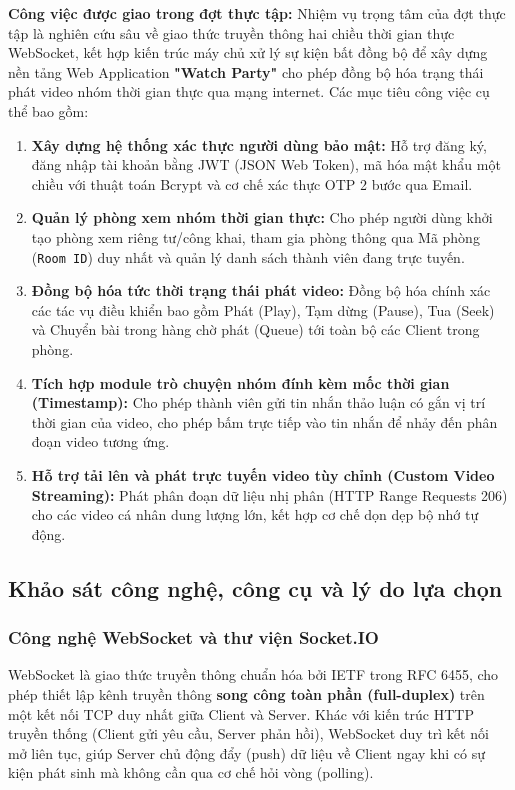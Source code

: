 \documentclass[12pt,a4paper]{extarticle}
\begin{document}
\textbf{Công việc được giao trong đợt thực tập:}
Nhiệm vụ trọng tâm của đợt thực tập là nghiên cứu sâu về giao thức truyền thông hai chiều thời gian thực WebSocket, kết hợp kiến trúc máy chủ xử lý sự kiện bất đồng bộ để xây dựng nền tảng Web Application \textbf{"Watch Party"} cho phép đồng bộ hóa trạng thái phát video nhóm thời gian thực qua mạng internet. Các mục tiêu công việc cụ thể bao gồm:
\begin{enumerate}[leftmargin=1.2cm]
    \item \textbf{Xây dựng hệ thống xác thực người dùng bảo mật:} Hỗ trợ đăng ký, đăng nhập tài khoản bằng JWT (JSON Web Token), mã hóa mật khẩu một chiều với thuật toán Bcrypt và cơ chế xác thực OTP 2 bước qua Email.
    \item \textbf{Quản lý phòng xem nhóm thời gian thực:} Cho phép người dùng khởi tạo phòng xem riêng tư/công khai, tham gia phòng thông qua Mã phòng (\texttt{Room ID}) duy nhất và quản lý danh sách thành viên đang trực tuyến.
    \item \textbf{Đồng bộ hóa tức thời trạng thái phát video:} Đồng bộ hóa chính xác các tác vụ điều khiển bao gồm Phát (Play), Tạm dừng (Pause), Tua (Seek) và Chuyển bài trong hàng chờ phát (Queue) tới toàn bộ các Client trong phòng.
    \item \textbf{Tích hợp module trò chuyện nhóm đính kèm mốc thời gian (Timestamp):} Cho phép thành viên gửi tin nhắn thảo luận có gắn vị trí thời gian của video, cho phép bấm trực tiếp vào tin nhắn để nhảy đến phân đoạn video tương ứng.
    \item \textbf{Hỗ trợ tải lên và phát trực tuyến video tùy chỉnh (Custom Video Streaming):} Phát phân đoạn dữ liệu nhị phân (HTTP Range Requests 206) cho các video cá nhân dung lượng lớn, kết hợp cơ chế dọn dẹp bộ nhớ tự động.
\end{enumerate}


\subsection{Khảo sát công nghệ, công cụ và lý do lựa chọn}

\subsubsection{Công nghệ WebSocket và thư viện Socket.IO}
WebSocket là giao thức truyền thông chuẩn hóa bởi IETF trong RFC 6455, cho phép thiết lập kênh truyền thông \textbf{song công toàn phần (full-duplex)} trên một kết nối TCP duy nhất giữa Client và Server. Khác với kiến trúc HTTP truyền thống (Client gửi yêu cầu, Server phản hồi), WebSocket duy trì kết nối mở liên tục, giúp Server chủ động đẩy (push) dữ liệu về Client ngay khi có sự kiện phát sinh mà không cần qua cơ chế hỏi vòng (polling).
\end{document}
